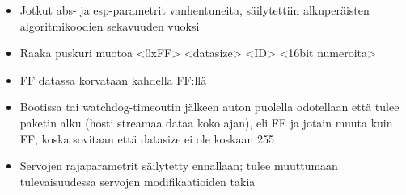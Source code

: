 \begin{itemize}
\item Jotkut abs- ja esp-parametrit vanhentuneita, säilytettiin alkuperäisten algoritmikoodien sekavuuden vuoksi
\item Raaka puskuri muotoa <0xFF> <datasize> <ID> <16bit numeroita>
\item FF datassa korvataan kahdella FF:llä
\item Bootissa tai watchdog-timeoutin jälkeen auton puolella odotellaan että tulee paketin alku (hosti streamaa dataa koko ajan), eli FF ja jotain muuta kuin FF, koska sovitaan että datasize ei ole koskaan 255
\item Servojen rajaparametrit säilytetty ennallaan; tulee muuttumaan tulevaisuudessa servojen modifikaatioiden takia
\end{itemize}

